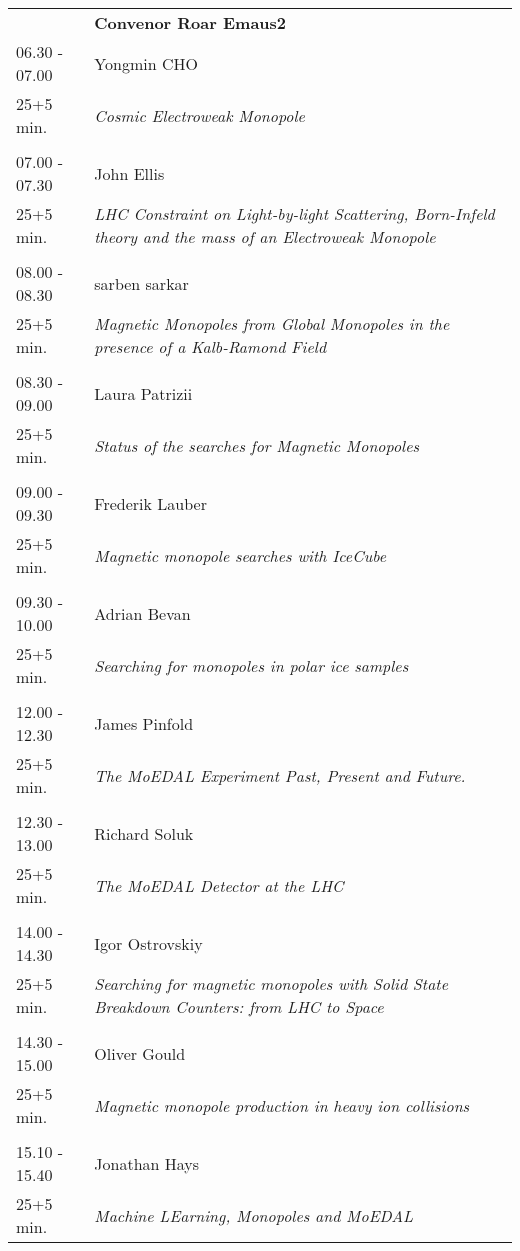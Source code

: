\begin{longtable}{p{3cm}p{13cm}}
&\hfill {\bf Convenor Roar Emaus2 }\\ 
06.30 - 07.00 & Yongmin CHO\\ 
25+5 min. & {\it Cosmic Electroweak Monopole}\\ 
 & \\ 
07.00 - 07.30 & John Ellis\\ 
25+5 min. & {\it LHC Constraint on Light-by-light Scattering, Born-Infeld theory and the mass of an Electroweak Monopole}\\ 
 & \\ 
08.00 - 08.30 & sarben sarkar\\ 
25+5 min. & {\it Magnetic Monopoles from Global Monopoles in the presence of a Kalb-Ramond Field}\\ 
 & \\ 
08.30 - 09.00 & Laura Patrizii\\ 
25+5 min. & {\it Status of the searches for Magnetic Monopoles}\\ 
 & \\ 
09.00 - 09.30 & Frederik Lauber\\ 
25+5 min. & {\it Magnetic monopole searches with IceCube}\\ 
 & \\ 
09.30 - 10.00 & Adrian Bevan\\ 
25+5 min. & {\it Searching for monopoles in polar ice samples}\\ 
 & \\ 
12.00 - 12.30 & James Pinfold\\ 
25+5 min. & {\it The MoEDAL Experiment Past, Present and Future.}\\ 
 & \\ 
12.30 - 13.00 & Richard Soluk\\ 
25+5 min. & {\it The MoEDAL Detector at the LHC}\\ 
 & \\ 
14.00 - 14.30 & Igor Ostrovskiy\\ 
25+5 min. & {\it Searching for magnetic monopoles with Solid State Breakdown Counters: from LHC to Space}\\ 
 & \\ 
14.30 - 15.00 & Oliver Gould\\ 
25+5 min. & {\it Magnetic monopole production in heavy ion collisions}\\ 
 & \\ 
15.10 - 15.40 & Jonathan Hays\\ 
25+5 min. & {\it Machine LEarning, Monopoles and MoEDAL}\\ 

\end{longtable}

